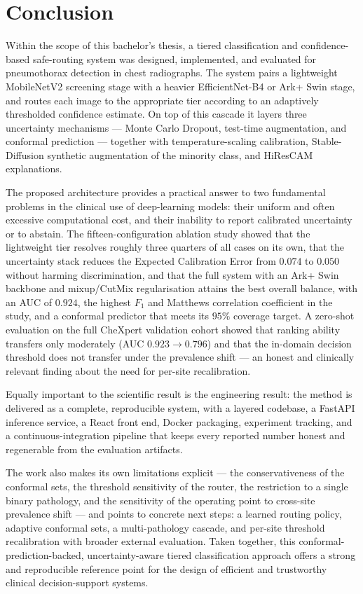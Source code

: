 \chapter{Conclusion}
\label{ch:conclusion}

Within the scope of this bachelor's thesis, a tiered classification and confidence-based safe-routing system was designed, implemented, and evaluated for pneumothorax detection in chest radiographs. The system pairs a lightweight MobileNetV2 screening stage with a heavier EfficientNet-B4 or Ark+ Swin stage, and routes each image to the appropriate tier according to an adaptively thresholded confidence estimate. On top of this cascade it layers three uncertainty mechanisms --- Monte Carlo Dropout, test-time augmentation, and conformal prediction --- together with temperature-scaling calibration, Stable-Diffusion synthetic augmentation of the minority class, and HiResCAM explanations.

The proposed architecture provides a practical answer to two fundamental problems in the clinical use of deep-learning models: their uniform and often excessive computational cost, and their inability to report calibrated uncertainty or to abstain. The fifteen-configuration ablation study showed that the lightweight tier resolves roughly three quarters of all cases on its own, that the uncertainty stack reduces the Expected Calibration Error from $0.074$ to $0.050$ without harming discrimination, and that the full system with an Ark+ Swin backbone and mixup/CutMix regularisation attains the best overall balance, with an AUC of $0.924$, the highest $F_1$ and Matthews correlation coefficient in the study, and a conformal predictor that meets its $95\%$ coverage target. A zero-shot evaluation on the full CheXpert validation cohort showed that ranking ability transfers only moderately (AUC $0.923 \rightarrow 0.796$) and that the in-domain decision threshold does not transfer under the prevalence shift --- an honest and clinically relevant finding about the need for per-site recalibration.

Equally important to the scientific result is the engineering result: the method is delivered as a complete, reproducible system, with a layered codebase, a FastAPI inference service, a React front end, Docker packaging, experiment tracking, and a continuous-integration pipeline that keeps every reported number honest and regenerable from the evaluation artifacts.

The work also makes its own limitations explicit --- the conservativeness of the conformal sets, the threshold sensitivity of the router, the restriction to a single binary pathology, and the sensitivity of the operating point to cross-site prevalence shift --- and points to concrete next steps: a learned routing policy, adaptive conformal sets, a multi-pathology cascade, and per-site threshold recalibration with broader external evaluation. Taken together, this conformal-prediction-backed, uncertainty-aware tiered classification approach offers a strong and reproducible reference point for the design of efficient and trustworthy clinical decision-support systems.
